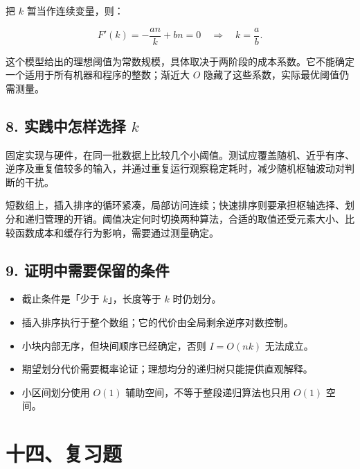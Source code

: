 \documentclass[
  UTF8,fontset=none,zihao=5]{ctexart}
\providecommand{\tightlist}{%
  \setlength{\itemsep}{0pt}\setlength{\parskip}{0pt}}
\let\OldSection\section
\renewcommand{\section}{\Needspace{5\baselineskip}\OldSection}
\let\OldSubsection\subsection
\renewcommand{\subsection}{\Needspace{4\baselineskip}\OldSubsection}
\begin{document}
把 \(k\) 暂当作连续变量，则：

\[
F'(k)=-\frac{an}{k}+bn=0
\quad\Longrightarrow\quad
k=\frac ab.
\]

这个模型给出的理想阈值为常数规模，具体取决于两阶段的成本系数。它不能确定一个适用于所有机器和程序的整数；渐近大
\(O\) 隐藏了这些系数，实际最优阈值仍需测量。

\hypertarget{ux5b9eux8df5ux4e2dux600eux6837ux9009ux62e9-k}{%
\subsection{\texorpdfstring{8. 实践中怎样选择
\(k\)}{8. 实践中怎样选择 k}}\label{ux5b9eux8df5ux4e2dux600eux6837ux9009ux62e9-k}}

固定实现与硬件，在同一批数据上比较几个小阈值。测试应覆盖随机、近乎有序、逆序及重复值较多的输入，并通过重复运行观察稳定耗时，减少随机枢轴波动对判断的干扰。

短数组上，插入排序的循环紧凑，局部访问连续；快速排序则要承担枢轴选择、划分和递归管理的开销。阈值决定何时切换两种算法，合适的取值还受元素大小、比较函数成本和缓存行为影响，需要通过测量确定。

\hypertarget{ux8bc1ux660eux4e2dux9700ux8981ux4fddux7559ux7684ux6761ux4ef6}{%
\subsection{9.
证明中需要保留的条件}\label{ux8bc1ux660eux4e2dux9700ux8981ux4fddux7559ux7684ux6761ux4ef6}}

\begin{itemize}
\tightlist
\item
  截止条件是「少于 \(k\)」，长度等于 \(k\) 时仍划分。
\item
  插入排序执行于整个数组；它的代价由全局剩余逆序对数控制。
\item
  小块内部无序，但块间顺序已经确定，否则 \(I=O(nk)\) 无法成立。
\item
  期望划分代价需要概率论证；理想均分的递归树只能提供直观解释。
\item
  小区间划分使用 \(O(1)\) 辅助空间，不等于整段递归算法也只用 \(O(1)\)
  空间。
\end{itemize}

\hypertarget{ux5341ux56dbux590dux4e60ux9898}{%
\section{十四、复习题}\label{ux5341ux56dbux590dux4e60ux9898}}
\end{document}
